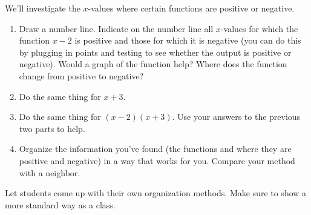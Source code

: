 \documentclass[noauthor]{ximera}
\begin{document}
\begin{problem}
We'll investigate the \(x\)-values where certain functions are positive or negative.

\begin{enumerate}
    \item Draw a number line. Indicate on the number line all \(x\)-values
    for which the function \(x - 2\) is positive and those for which
    it is negative (you can do this by plugging in points and testing
    to see whether the output is positive or negative). Would a graph 
    of the function help? 
    Where does the function change from positive to negative?
    \item Do the same thing for \(x + 3\).
    \item Do the same thing for \((x - 2)(x + 3)\). Use your answers to
    the previous two parts to help.
    \item Organize the information you've found (the functions and where they
    are positive and negative) in a way that works for
    you. Compare your method with a neighbor.
\end{enumerate}

\begin{instructorNotes}
Let students come up with their own organization methods. Make sure to show
a more standard way as a class.
\end{instructorNotes}
\end{problem}
\end{document}
